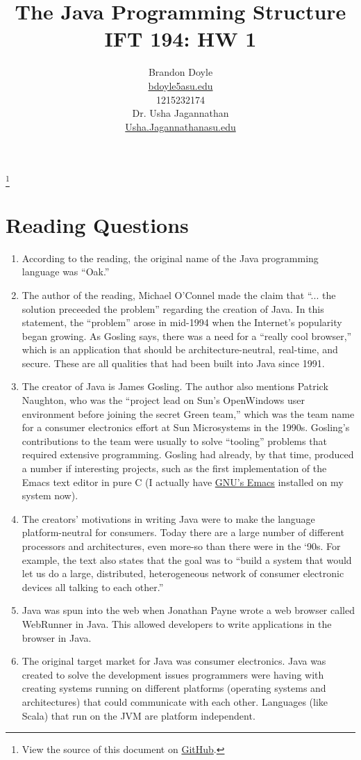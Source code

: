 \documentclass[leqno, 11pt]{article}
\title{\vspace{6ex}The Java Programming Structure\\
  \Large IFT 194: HW 1}
\author{Brandon Doyle\\
\href{mailto:bdoyle@asu.edu}{bdoyle5\at{}asu.edu}\\
1215232174\\[1em]
Dr. Usha Jagannathan\\
\href{mailto:Usha.Jagannathan@asu.edu}{Usha.Jagannathan\at{}asu.edu}}
\newcommand\blfootnote[1]{%
  \begingroup
    \renewcommand\thefootnote{}\footnote{#1}
    \addtocounter{footnote}{-1}
  \endgroup
}
\begin{document}
\begin{titlepage}
\clearpage\maketitle
\thispagestyle{empty}
\end{titlepage}
\blfootnote{View the source of this document on \href{https://github.com/bjd2385/IFT_194_labs/blob/master/\jobname.tex}{GitHub}.}
\section*{Reading Questions}
\begin{enumerate}
  \item According to the reading, the original name of the Java programming language was ``Oak.''
  \item The author of the reading, Michael O'Connel made the claim that ``... the solution preceeded the problem'' regarding the creation of Java. In this statement, the ``problem'' arose in mid-1994 when the Internet's popularity began growing. As Gosling says, there was a need for a ``really cool browser,'' which is an application that should be architecture-neutral, real-time, and secure. These are all qualities that had been built into Java since 1991.
  \item The creator of Java is James Gosling. The author also mentions Patrick Naughton, who was the ``project lead on Sun's OpenWindows user environment before joining the secret Green team,'' which was the team name for a consumer electronics effort at Sun Microsystems in the 1990s. Gosling's contributions to the team were usually to solve ``tooling'' problems that required extensive programming. Gosling had already, by that time, produced a number if interesting projects, such as the first implementation of the Emacs text editor in pure C (I actually have \href{https://www.gnu.org/software/emacs/}{GNU's Emacs} installed on my system now).
  \item The creators' motivations in writing Java were to make the language platform-neutral for consumers. Today there are a large number of different processors and architectures, even more-so than there were in the `90s. For example, the text also states that the goal was to ``build a system that would let us do a large, distributed, heterogeneous network of consumer electronic devices all talking to each other.''
  \item Java was spun into the web when Jonathan Payne wrote a web browser called WebRunner in Java. This allowed developers to write applications in the browser in Java.
  \item The original target market for Java was consumer electronics. Java was created to solve the development issues programmers were having with creating systems running on different platforms (operating systems and architectures) that could communicate with each other. Languages (like Scala) that run on the JVM are platform independent.
\end{enumerate}
\end{document}

